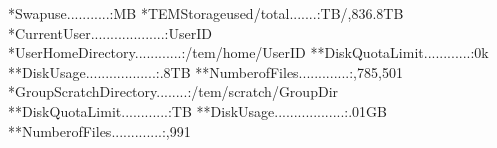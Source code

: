 \documentclass[a4paper,11pt,english]{sphinxmanual}
\begin{document}
\begin{sphinxVerbatim}[commandchars=\\\{\}]
*Swapuse...........:MB
\PYGZhy{}\PYGZhy{}\PYGZhy{}\PYGZhy{}\PYGZhy{}\PYGZhy{}\PYGZhy{}\PYGZhy{}\PYGZhy{}\PYGZhy{}\PYGZhy{}\PYGZhy{}\PYGZhy{}\PYGZhy{}\PYGZhy{}\PYGZhy{}\PYGZhy{}\PYGZhy{}\PYGZhy{}\PYGZhy{}\PYGZhy{}\PYGZhy{}\PYGZhy{}\PYGZhy{}\PYGZhy{}\PYGZhy{}\PYGZhy{}\PYGZhy{}\PYGZhy{}\PYGZhy{}\PYGZhy{}\PYGZhy{}\PYGZhy{}\PYGZhy{}\PYGZhy{}\PYGZhy{}\PYGZhy{}\PYGZhy{}\PYGZhy{}\PYGZhy{}\PYGZhy{}\PYGZhy{}\PYGZhy{}\PYGZhy{}\PYGZhy{}\PYGZhy{}\PYGZhy{}\PYGZhy{}\PYGZhy{}\PYGZhy{}\PYGZhy{}\PYGZhy{}\PYGZhy{}\PYGZhy{}\PYGZhy{}\PYGZhy{}\PYGZhy{}\PYGZhy{}\PYGZhy{}\PYGZhy{}\PYGZhy{}\PYGZhy{}\PYGZhy{}\PYGZhy{}\PYGZhy{}\PYGZhy{}\PYGZhy{}\PYGZhy{}\PYGZhy{}\PYGZhy{}\PYGZhy{}\PYGZhy{}\PYGZhy{}\PYGZhy{}
*TEMStorageused/total.......:TB/,836.8TB\PYGZpc{}
*CurrentUser...................:\PYGZlt{}UserID\PYGZgt{}
*UserHomeDirectory............:/tem/home/\PYGZlt{}UserID\PYGZgt{}
**DiskQuotaLimit............:0k
**DiskUsage..................:.8TB
**NumberofFiles.............:,785,501
*GroupScratchDirectory........:/tem/scratch/\PYGZlt{}GroupDir\PYGZgt{}
**DiskQuotaLimit............:TB
**DiskUsage..................:.01GB
**NumberofFiles.............:,991

\end{sphinxVerbatim}
\end{document}
